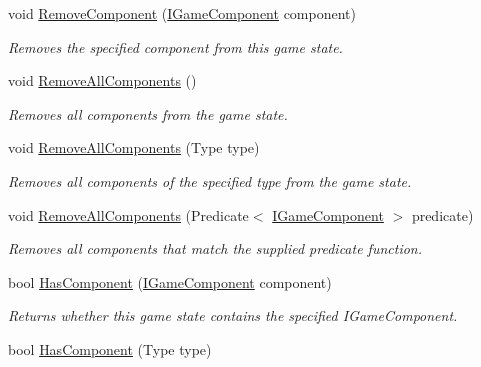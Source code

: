 \begin{DoxyCompactItemize}
void \hyperlink{interface_tri_devs_1_1_tri_engine2_d_1_1_state_management_1_1_i_game_state_ad7fa5ae6b76df79ae2169c2a74b0db80}{Remove\-Component} (\hyperlink{interface_tri_devs_1_1_tri_engine2_d_1_1_interfaces_1_1_i_game_component}{I\-Game\-Component} component)
\begin{DoxyCompactList}\small\item\em Removes the specified component from this game state. \end{DoxyCompactList}\item 
void \hyperlink{interface_tri_devs_1_1_tri_engine2_d_1_1_state_management_1_1_i_game_state_a6d7b5f2b3c37d594ce0560fdaffebe7c}{Remove\-All\-Components} ()
\begin{DoxyCompactList}\small\item\em Removes all components from the game state. \end{DoxyCompactList}\item 
void \hyperlink{interface_tri_devs_1_1_tri_engine2_d_1_1_state_management_1_1_i_game_state_ac82937b788730843ebbe061cb1bb7d9b}{Remove\-All\-Components} (Type type)
\begin{DoxyCompactList}\small\item\em Removes all components of the specified type from the game state. \end{DoxyCompactList}\item 
void \hyperlink{interface_tri_devs_1_1_tri_engine2_d_1_1_state_management_1_1_i_game_state_a23dba9d89cbb4609f86e57eb6d0c75f5}{Remove\-All\-Components} (Predicate$<$ \hyperlink{interface_tri_devs_1_1_tri_engine2_d_1_1_interfaces_1_1_i_game_component}{I\-Game\-Component} $>$ predicate)
\begin{DoxyCompactList}\small\item\em Removes all components that match the supplied predicate function. \end{DoxyCompactList}\item 
bool \hyperlink{interface_tri_devs_1_1_tri_engine2_d_1_1_state_management_1_1_i_game_state_a5bdc1ce8af050df597558952107a91c7}{Has\-Component} (\hyperlink{interface_tri_devs_1_1_tri_engine2_d_1_1_interfaces_1_1_i_game_component}{I\-Game\-Component} component)
\begin{DoxyCompactList}\small\item\em Returns whether this game state contains the specified I\-Game\-Component. \end{DoxyCompactList}\item 
bool \hyperlink{interface_tri_devs_1_1_tri_engine2_d_1_1_state_management_1_1_i_game_state_aa9f5263ae51eabc6535d977d714b98d2}{Has\-Component} (Type type)

\end{DoxyCompactItemize}
